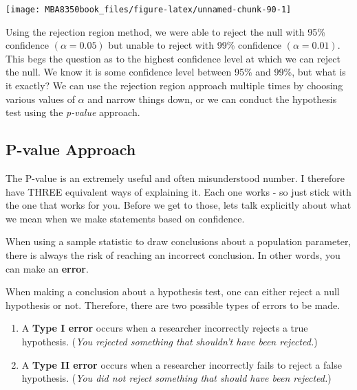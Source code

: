 \documentclass[
]{book}
\begin{document}
\begin{center}\texttt{[image: MBA8350book\_files/figure-latex/unnamed-chunk-90-1]} \end{center}

Using the rejection region method, we were able to reject the null with 95\% confidence \((\alpha=0.05)\) but unable to reject with 99\% confidence \((\alpha=0.01)\). This begs the question as to the highest confidence level at which we can reject the null. We know it is some confidence level between 95\% and 99\%, but what is it exactly? We can use the rejection region approach multiple times by choosing various values of \(\alpha\) and narrow things down, or we can conduct the hypothesis test using the \emph{p-value} approach.

\hypertarget{p-value-approach}{%
\subsection{P-value Approach}\label{p-value-approach}}

The P-value is an extremely useful and often misunderstood number. I therefore have THREE equivalent ways of explaining it. Each one works - so just stick with the one that works for you. Before we get to those, lets talk explicitly about what we mean when we make statements based on confidence.

When using a sample statistic to draw conclusions about a population parameter, there is always the risk of reaching an incorrect conclusion. In other words, you can make an \textbf{error}.

When making a conclusion about a hypothesis test, one can either reject a null hypothesis or not. Therefore, there are two possible types of errors to be made.

\begin{enumerate}
\def\labelenumi{\arabic{enumi}.}
\item
  A \textbf{Type I error} occurs when a researcher incorrectly rejects a true hypothesis. (\emph{You rejected something that shouldn't have been rejected.})
\item
  A \textbf{Type II error} occurs when a researcher incorrectly fails to reject a false hypothesis. (\emph{You did not reject something that should have been rejected.})
\end{enumerate}
\end{document}
